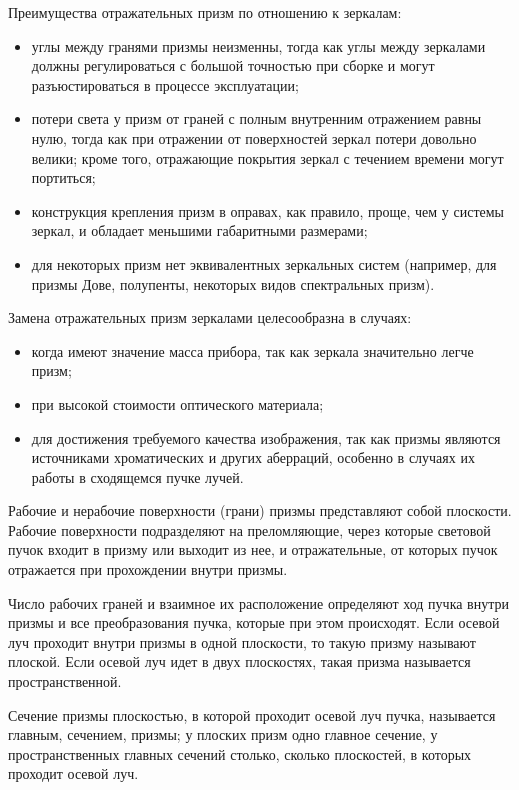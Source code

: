 Преимущества отражательных призм по отношению к зеркалам:
\begin{itemize}
\item углы между гранями призмы неизменны, тогда как углы между зеркалами должны регулироваться с большой точностью при сборке и могут разъюстироваться в процессе эксплуатации;
\item потери света у призм от граней с полным внутренним отражением равны нулю, тогда как при отражении от поверхностей зеркал потери довольно велики; кроме того, отражающие покрытия зеркал с течением времени могут портиться;
\item конструкция крепления призм в оправах, как правило, проще, чем у системы зеркал, и обладает меньшими габаритными размерами;
\item для некоторых призм нет эквивалентных зеркальных систем (например, для призмы Дове, полупенты, некоторых видов спектральных призм).
\end{itemize}
 
Замена отражательных призм зеркалами целесообразна в случаях:
\begin{itemize}
\item когда имеют значение масса прибора, так как зеркала значительно легче призм; 
\item при высокой стоимости оптического материала;
\item для достижения требуемого качества изображения, так как призмы являются источниками хроматических и других аберраций, особенно в случаях их работы в сходящемся пучке лучей.
\end{itemize}

Рабочие и нерабочие поверхности (грани) призмы представляют собой плоскости. Рабочие поверхности подразделяют на преломляющие, через которые световой пучок входит в призму или выходит из нее, и отражательные, от которых пучок отражается при прохождении внутри призмы.

Число рабочих граней и взаимное их расположение определяют ход пучка внутри призмы и все преобразования пучка, которые при этом происходят.
Если осевой луч проходит внутри призмы в одной плоскости, то такую призму называют плоской. Если осевой луч идет в двух плоскостях, такая призма называется пространственной.

Сечение призмы плоскостью, в которой проходит осевой луч пучка, называется главным, сечением, призмы; у плоских призм одно главное сечение, у пространственных главных сечений столько, сколько плоскостей, в которых проходит осевой луч.

